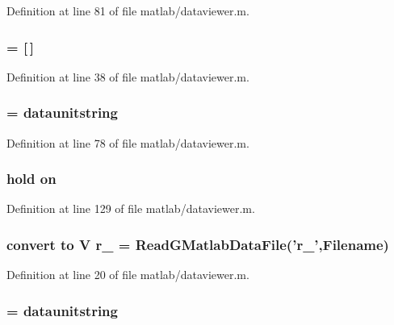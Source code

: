 Definition at line 81 of file matlab/dataviewer.m.
\subsubsection[{i\_\-k}]{ = [$\,$]}\label{matlab_2dataviewer_8m_a74bf25866b0276ef17406088400a2a4e}


Definition at line 38 of file matlab/dataviewer.m.
\subsubsection[{i\_\-k\_\-unitstring}]{ = {\bf dataunitstring}}\label{matlab_2dataviewer_8m_a2ab0da5d9a9a6415fa8e2b7dae164c7c}


Definition at line 78 of file matlab/dataviewer.m.
\subsubsection[{on}]{\setlength{\rightskip}{0pt plus 5cm}hold {\bf on}}\label{matlab_2dataviewer_8m_a58ab1fd68e97078232808206b850161b}


Definition at line 129 of file matlab/dataviewer.m.
\subsubsection[{r\_\-1}]{\setlength{\rightskip}{0pt plus 5cm}convert to V r\_ = ReadGMatlabDataFile('r\_',{\bf Filename})}\label{matlab_2dataviewer_8m_a42f132e2f712134d1339dec81b3a6b04}


Definition at line 20 of file matlab/dataviewer.m.
\subsubsection[{r\_\-1\_\-unitstring}]{ = {\bf dataunitstring}}\label{matlab_2dataviewer_8m_a4e6d91426e0cc4a748bd5bb05e66d5ad}


